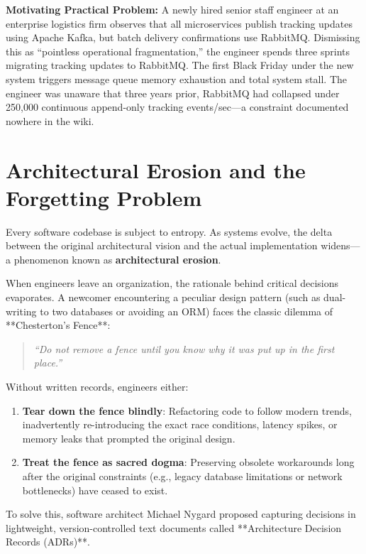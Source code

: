 \begin{chaptergoalsbox}
\textbf{Motivating Practical Problem:}
A newly hired senior staff engineer at an enterprise logistics firm observes that all microservices publish tracking updates using Apache Kafka, but batch delivery confirmations use RabbitMQ. Dismissing this as ``pointless operational fragmentation,'' the engineer spends three sprints migrating tracking updates to RabbitMQ. The first Black Friday under the new system triggers message queue memory exhaustion and total system stall. The engineer was unaware that three years prior, RabbitMQ had collapsed under 250,000 continuous append-only tracking events/sec—a constraint documented nowhere in the wiki.
\end{chaptergoalsbox}

\section{Architectural Erosion and the Forgetting Problem}

Every software codebase is subject to entropy. As systems evolve, the delta between the original architectural vision and the actual implementation widens—a phenomenon known as \textbf{architectural erosion}.

When engineers leave an organization, the rationale behind critical decisions evaporates. A newcomer encountering a peculiar design pattern (such as dual-writing to two databases or avoiding an ORM) faces the classic dilemma of **Chesterton's Fence**:
\begin{quote}
\textit{``Do not remove a fence until you know why it was put up in the first place.''}
\end{quote}

Without written records, engineers either:
\begin{enumerate}[leftmargin=18pt]
  \item \textbf{Tear down the fence blindly}: Refactoring code to follow modern trends, inadvertently re-introducing the exact race conditions, latency spikes, or memory leaks that prompted the original design.
  \item \textbf{Treat the fence as sacred dogma}: Preserving obsolete workarounds long after the original constraints (e.g., legacy database limitations or network bottlenecks) have ceased to exist.
\end{enumerate}

To solve this, software architect Michael Nygard proposed capturing decisions in lightweight, version-controlled text documents called **Architecture Decision Records (ADRs)**.

